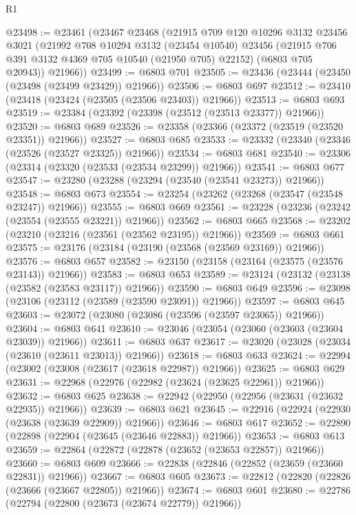 \begin{lexlean}{R1}
\begin{coremodule}
@23498 := @23461
    (@23467
      @23468
      (@21915
        @709
        @120
        @10296
        @3132
        @23456
        @3021
        (@21992
          @708
          @10294
          @3132
          (@23454 @10540)
          @23456
          (@21915 @706 @391 @3132 @4369 @705 @10540 (@21950 @705) @22152)
          (@6803 @705 @20943))
        @21966))
@23499 := @6803 @701
@23505 := @23436 (@23444 (@23450 (@23498 (@23499 @23429)) @21966))
@23506 := @6803 @697
@23512 := @23410 (@23418 (@23424 (@23505 (@23506 @23403)) @21966))
@23513 := @6803 @693
@23519 := @23384 (@23392 (@23398 (@23512 (@23513 @23377)) @21966))
@23520 := @6803 @689
@23526 := @23358 (@23366 (@23372 (@23519 (@23520 @23351)) @21966))
@23527 := @6803 @685
@23533 := @23332 (@23340 (@23346 (@23526 (@23527 @23325)) @21966))
@23534 := @6803 @681
@23540 := @23306 (@23314 (@23320 (@23533 (@23534 @23299)) @21966))
@23541 := @6803 @677
@23547 := @23280 (@23288 (@23294 (@23540 (@23541 @23273)) @21966))
@23548 := @6803 @673
@23554 := @23254 (@23262 (@23268 (@23547 (@23548 @23247)) @21966))
@23555 := @6803 @669
@23561 := @23228 (@23236 (@23242 (@23554 (@23555 @23221)) @21966))
@23562 := @6803 @665
@23568 := @23202 (@23210 (@23216 (@23561 (@23562 @23195)) @21966))
@23569 := @6803 @661
@23575 := @23176 (@23184 (@23190 (@23568 (@23569 @23169)) @21966))
@23576 := @6803 @657
@23582 := @23150 (@23158 (@23164 (@23575 (@23576 @23143)) @21966))
@23583 := @6803 @653
@23589 := @23124 (@23132 (@23138 (@23582 (@23583 @23117)) @21966))
@23590 := @6803 @649
@23596 := @23098 (@23106 (@23112 (@23589 (@23590 @23091)) @21966))
@23597 := @6803 @645
@23603 := @23072 (@23080 (@23086 (@23596 (@23597 @23065)) @21966))
@23604 := @6803 @641
@23610 := @23046 (@23054 (@23060 (@23603 (@23604 @23039)) @21966))
@23611 := @6803 @637
@23617 := @23020 (@23028 (@23034 (@23610 (@23611 @23013)) @21966))
@23618 := @6803 @633
@23624 := @22994 (@23002 (@23008 (@23617 (@23618 @22987)) @21966))
@23625 := @6803 @629
@23631 := @22968 (@22976 (@22982 (@23624 (@23625 @22961)) @21966))
@23632 := @6803 @625
@23638 := @22942 (@22950 (@22956 (@23631 (@23632 @22935)) @21966))
@23639 := @6803 @621
@23645 := @22916 (@22924 (@22930 (@23638 (@23639 @22909)) @21966))
@23646 := @6803 @617
@23652 := @22890 (@22898 (@22904 (@23645 (@23646 @22883)) @21966))
@23653 := @6803 @613
@23659 := @22864 (@22872 (@22878 (@23652 (@23653 @22857)) @21966))
@23660 := @6803 @609
@23666 := @22838 (@22846 (@22852 (@23659 (@23660 @22831)) @21966))
@23667 := @6803 @605
@23673 := @22812 (@22820 (@22826 (@23666 (@23667 @22805)) @21966))
@23674 := @6803 @601
@23680 := @22786 (@22794 (@22800 (@23673 (@23674 @22779)) @21966))

\end{coremodule}
\end{lexlean}
